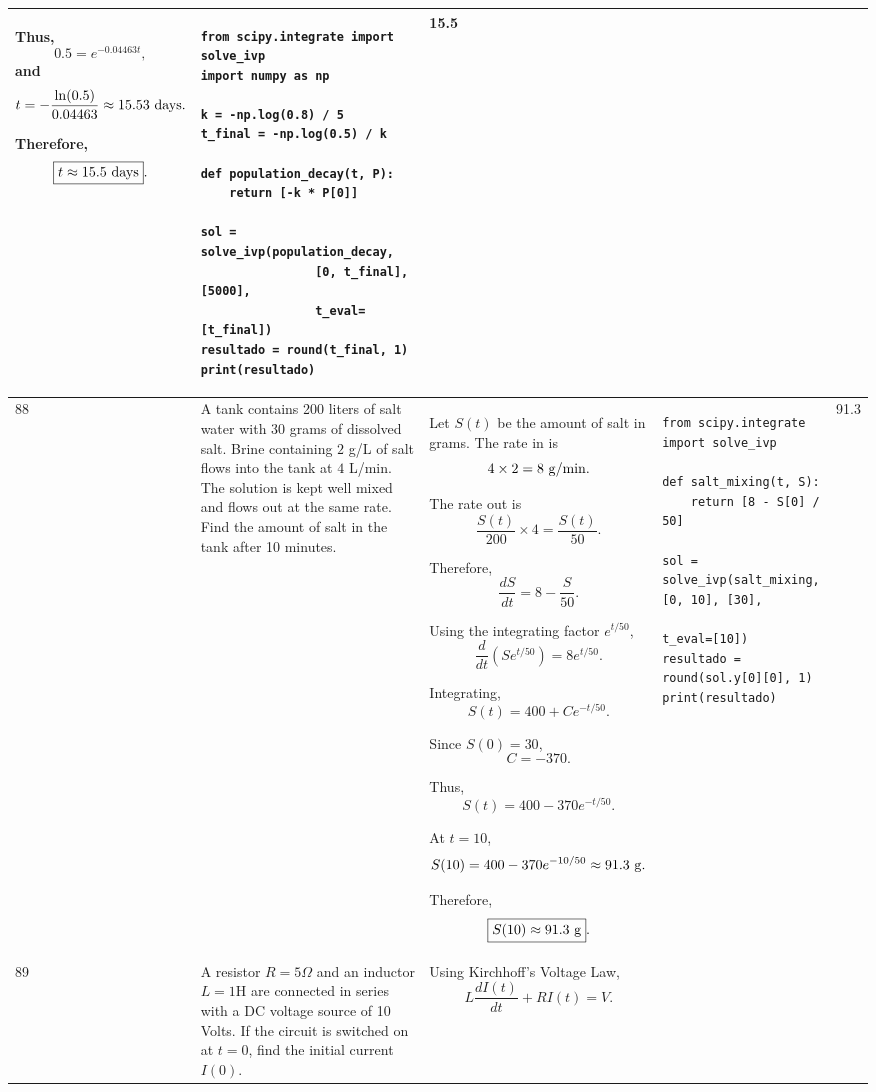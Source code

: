 \documentclass[a4paper,12pt]{article}
\begin{document}
\begin{longtable}{|p{0.3cm}|p{}|p{10cm}|p{}|p{1.5cm}|}
Thus,
\[
0.5=e^{-0.04463t},
\]
and
\[
t=-\frac{\ln(0.5)}{0.04463}
\approx15.53\ {\rm days}.
\]

Therefore,
\[
\boxed{t\approx15.5\ {\rm days}}.
\]
&
\begin{verbatim}
from scipy.integrate import solve_ivp
import numpy as np

k = -np.log(0.8) / 5
t_final = -np.log(0.5) / k

def population_decay(t, P):
    return [-k * P[0]]

sol = solve_ivp(population_decay,
                [0, t_final], [5000],
                t_eval=[t_final])
resultado = round(t_final, 1)
print(resultado)
\end{verbatim}
&
15.5 \\
\hline

88 &
A tank contains 200 liters of salt water with 30 grams of dissolved salt. Brine containing $2$ g/L of salt flows into the tank at $4$ L/min. The solution is kept well mixed and flows out at the same rate. Find the amount of salt in the tank after 10 minutes. &
Let $S(t)$ be the amount of salt in grams. The rate in is
\[
4\times2=8\ {\rm g/min}.
\]

The rate out is
\[
\frac{S(t)}{200}\times4
=\frac{S(t)}{50}.
\]

Therefore,
\[
\frac{dS}{dt}=8-\frac{S}{50}.
\]

Using the integrating factor $e^{t/50}$,
\[
\frac{d}{dt}
\left(Se^{t/50}\right)
=8e^{t/50}.
\]

Integrating,
\[
S(t)=400+Ce^{-t/50}.
\]

Since $S(0)=30$,
\[
C=-370.
\]

Thus,
\[
S(t)=400-370e^{-t/50}.
\]

At $t=10$,
\[
S(10)=400-370e^{-10/50}
\approx91.3\ {\rm g}.
\]

Therefore,
\[
\boxed{S(10)\approx91.3\ {\rm g}}.
\]
&
\begin{verbatim}
from scipy.integrate import solve_ivp

def salt_mixing(t, S):
    return [8 - S[0] / 50]

sol = solve_ivp(salt_mixing, [0, 10], [30],
                t_eval=[10])
resultado = round(sol.y[0][0], 1)
print(resultado)
\end{verbatim}
&
91.3 \\
\hline
89 &
A resistor $R=5\Omega$ and an inductor $L=1$H are connected in series with a DC voltage source of 10 Volts. If the circuit is switched on at $t=0$, find the initial current $I(0)$. &
Using Kirchhoff's Voltage Law,
\[
L\frac{dI(t)}{dt}+RI(t)=V.
\]


\end{longtable}
\end{document}
